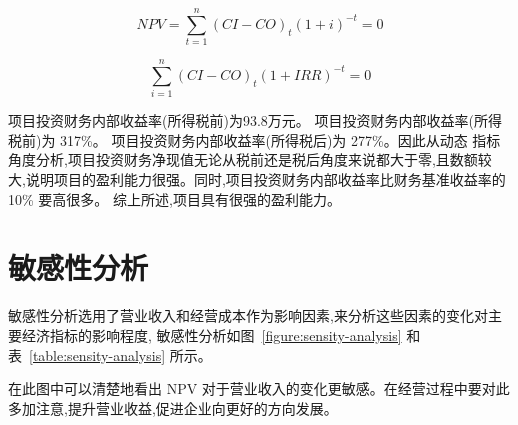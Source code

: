 \begin{equation}
\label{eq:npv}
        NPV = \sum _{t = 1}^{n} (CI - CO)_{t} (1 + i)^{-t} = 0
\end{equation}

\begin{equation}
\label{eq:irr}
        \sum _{i = 1}^{n} (CI - CO)_{t} (1 + IRR)^{-t} = 0
\end{equation}

项目投资财务内部收益率(所得税前)为93.8万元。
项目投资财务内部收益率(所得税前)为 317\%。
项目投资财务内部收益率(所得税后)为 277\%。因此从动态
指标角度分析,项目投资财务净现值无论从税前还是税后角度来说都大于零,且数额较
大,说明项目的盈利能力很强。同时,项目投资财务内部收益率比财务基准收益率的 10\%
要高很多。
综上所述,项目具有很强的盈利能力。

\section{敏感性分析}
敏感性分析选用了营业收入和经营成本作为影响因素,来分析这些因素的变化对主
要经济指标的影响程度, 敏感性分析如图~\ref{figure:sensity-analysis} 和
表~\ref{table:sensity-analysis} 所示。


在此图中可以清楚地看出 NPV 对于营业收入的变化更敏感。在经营过程中要对此
多加注意,提升营业收益,促进企业向更好的方向发展。
